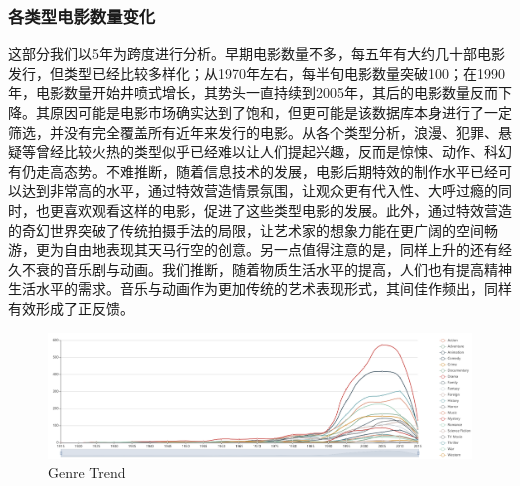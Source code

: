 \documentclass[UTF8]{ctexart}
\begin{document}
\subsubsection{各类型电影数量变化}
\par 这部分我们以5年为跨度进行分析。早期电影数量不多，每五年有大约几十部电影发行，但类型已经比较多样化；从1970年左右，每半旬电影数量突破100；在1990年，电影数量开始井喷式增长，其势头一直持续到2005年，其后的电影数量反而下降。其原因可能是电影市场确实达到了饱和，但更可能是该数据库本身进行了一定筛选，并没有完全覆盖所有近年来发行的电影。从各个类型分析，浪漫、犯罪、悬疑等曾经比较火热的类型似乎已经难以让人们提起兴趣，反而是惊悚、动作、科幻有仍走高态势。不难推断，随着信息技术的发展，电影后期特效的制作水平已经可以达到非常高的水平，通过特效营造情景氛围，让观众更有代入性、大呼过瘾的同时，也更喜欢观看这样的电影，促进了这些类型电影的发展。此外，通过特效营造的奇幻世界突破了传统拍摄手法的局限，让艺术家的想象力能在更广阔的空间畅游，更为自由地表现其天马行空的创意。另一点值得注意的是，同样上升的还有经久不衰的音乐剧与动画。我们推断，随着物质生活水平的提高，人们也有提高精神生活水平的需求。音乐与动画作为更加传统的艺术表现形式，其间佳作频出，同样有效形成了正反馈。
\begin{figure}[ht]
  \centering
  \includegraphics[scale=.3]{trend.png}
  \caption{Genre Trend}
\end{figure}
\end{document}
